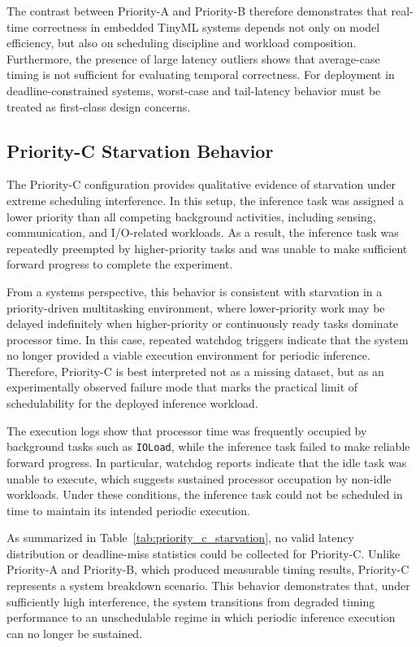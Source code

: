 \documentclass[conference]{IEEEtran}
\begin{document}
The contrast between Priority-A and Priority-B therefore demonstrates that real-time correctness in embedded TinyML systems depends not only on model efficiency, but also on scheduling discipline and workload composition. Furthermore, the presence of large latency outliers shows that average-case timing is not sufficient for evaluating temporal correctness. For deployment in deadline-constrained systems, worst-case and tail-latency behavior must be treated as first-class design concerns.

\subsection{Priority-C Starvation Behavior}
\label{subsec:priority_c_starvation}

The Priority-C configuration provides qualitative evidence of starvation under extreme scheduling interference. In this setup, the inference task was assigned a lower priority than all competing background activities, including sensing, communication, and I/O-related workloads. As a result, the inference task was repeatedly preempted by higher-priority tasks and was unable to make sufficient forward progress to complete the experiment.

From a systems perspective, this behavior is consistent with starvation in a priority-driven multitasking environment, where lower-priority work may be delayed indefinitely when higher-priority or continuously ready tasks dominate processor time. In this case, repeated watchdog triggers indicate that the system no longer provided a viable execution environment for periodic inference. Therefore, Priority-C is best interpreted not as a missing dataset, but as an experimentally observed failure mode that marks the practical limit of schedulability for the deployed inference workload.

The execution logs show that processor time was frequently occupied by background tasks such as \texttt{IOLoad}, while the inference task failed to make reliable forward progress. In particular, watchdog reports indicate that the idle task was unable to execute, which suggests sustained processor occupation by non-idle workloads. Under these conditions, the inference task could not be scheduled in time to maintain its intended periodic execution.

As summarized in Table~\ref{tab:priority_c_starvation}, no valid latency distribution or deadline-miss statistics could be collected for Priority-C. Unlike Priority-A and Priority-B, which produced measurable timing results, Priority-C represents a system breakdown scenario. This behavior demonstrates that, under sufficiently high interference, the system transitions from degraded timing performance to an unschedulable regime in which periodic inference execution can no longer be sustained.
\end{document}

